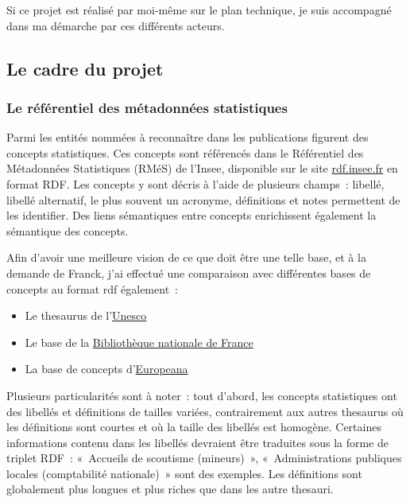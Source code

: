 Si ce projet est réalisé par moi-même sur le plan technique, je suis accompagné dans ma démarche par ces différents acteurs.
\label{section 1.1.2}

\subsection{Le cadre du projet}

\subsubsection{Le référentiel des métadonnées statistiques}
Parmi les entités nommées à reconnaître dans les publications figurent des concepts statistiques. Ces concepts sont référencés dans le Référentiel des Métadonnées Statistiques (RMéS) de l'Insee, disponible sur le site \href{http://rdf.insee.fr/sparql}{rdf.insee.fr} en format RDF. Les concepts y sont décris à l'aide de plusieurs champs~: libellé, libellé alternatif, le plus souvent un acronyme, définitions et notes permettent de les identifier. Des liens sémantiques entre concepts enrichissent également la sémantique des concepts.
\newline

Afin d'avoir une meilleure vision de ce que doit être une telle base, et à la demande de Franck, j'ai effectué une comparaison avec différentes bases de concepts au format rdf également~: 
\begin{itemize}
    \item Le thesaurus de l'\href{http://vocabularies.unesco.org/browser/thesaurus/en/?clang=fr}{Unesco}
    \item Le base de la \href{https://data.bnf.fr/current/sparql.html}{Bibliothèque nationale de France}
    \item La base de concepts d'\href{https://pro.europeana.eu/page/linked-open-data}{Europeana}
    \newline
\end{itemize}

Plusieurs particularités sont à noter~: tout d'abord, les concepts statistiques ont des libellés et définitions de tailles variées, contrairement aux autres thesaurus où les définitions sont courtes et où la taille des libellés est homogène. Certaines informations contenu dans les libellés devraient être traduites sous la forme de triplet RDF~: «~Accueils de scoutisme (mineurs)~», «~Administrations publiques locales (comptabilité nationale)~» sont des exemples. Les définitions sont globalement plus longues et plus riches que dans les autre thesauri.

